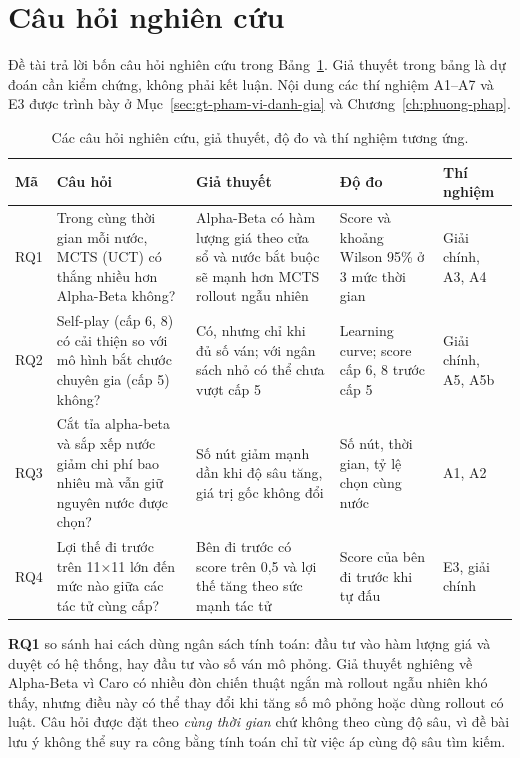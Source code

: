 \section{Câu hỏi nghiên cứu}
\label{sec:rq}
Đề tài trả lời bốn câu hỏi nghiên cứu trong Bảng~\ref{tab:gt-rq}. Giả thuyết trong bảng là dự đoán cần kiểm chứng, không phải kết luận. Nội dung các thí nghiệm A1--A7 và E3 được trình bày ở Mục~\ref{sec:gt-pham-vi-danh-gia} và Chương~\ref{ch:phuong-phap}.

\begin{table}[!htb]
  \centering\small
  \caption{Các câu hỏi nghiên cứu, giả thuyết, độ đo và thí nghiệm tương ứng.}
  \label{tab:gt-rq}
  \begin{tabularx}{\textwidth}{@{}l >{\raggedright\arraybackslash}X >{\raggedright\arraybackslash}X >{\raggedright\arraybackslash}p{} >{\raggedright\arraybackslash}p{}@{}}
    \toprule
    \textbf{Mã} & \textbf{Câu hỏi} & \textbf{Giả thuyết} & \textbf{Độ đo} & \textbf{Thí nghiệm} \\
    \midrule
    RQ1 & Trong cùng thời gian mỗi nước, MCTS (UCT) có thắng nhiều hơn Alpha-Beta không? & Alpha-Beta có hàm lượng giá theo cửa sổ và nước bắt buộc sẽ mạnh hơn MCTS rollout ngẫu nhiên & Score và khoảng Wilson 95\% ở 3 mức thời gian & Giải chính, A3, A4 \\
    \midrule
    RQ2 & Self-play (cấp 6, 8) có cải thiện so với mô hình bắt chước chuyên gia (cấp 5) không? & Có, nhưng chỉ khi đủ số ván; với ngân sách nhỏ có thể chưa vượt cấp 5 & Learning curve; score cấp 6, 8 trước cấp 5 & Giải chính, A5, A5b \\
    \midrule
    RQ3 & Cắt tỉa alpha-beta và sắp xếp nước giảm chi phí bao nhiêu mà vẫn giữ nguyên nước được chọn? & Số nút giảm mạnh dần khi độ sâu tăng, giá trị gốc không đổi & Số nút, thời gian, tỷ lệ chọn cùng nước & A1, A2 \\
    \midrule
    RQ4 & Lợi thế đi trước trên 11×11 lớn đến mức nào giữa các tác tử cùng cấp? & Bên đi trước có score trên 0,5 và lợi thế tăng theo sức mạnh tác tử & Score của bên đi trước khi tự đấu & E3, giải chính \\
    \bottomrule
  \end{tabularx}
\end{table}

\textbf{RQ1} so sánh hai cách dùng ngân sách tính toán: đầu tư vào hàm lượng giá và duyệt có hệ thống, hay đầu tư vào số ván mô phỏng. Giả thuyết nghiêng về Alpha-Beta vì Caro có nhiều đòn chiến thuật ngắn mà rollout ngẫu nhiên khó thấy, nhưng điều này có thể thay đổi khi tăng số mô phỏng hoặc dùng rollout có luật. Câu hỏi được đặt theo \emph{cùng thời gian} chứ không theo cùng độ sâu, vì đề bài lưu ý không thể suy ra công bằng tính toán chỉ từ việc áp cùng độ sâu tìm kiếm.

